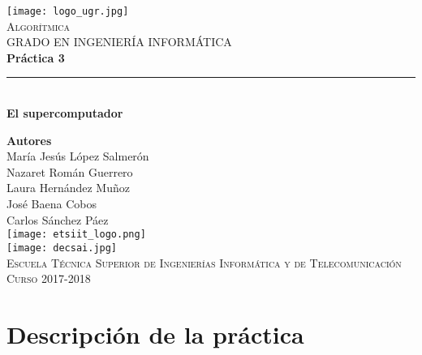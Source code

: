 \documentclass[12pt,spanish]{article}
\begin{document}
\begin{titlepage}

\newlength{\centeroffset}
\setlength{\centeroffset}{-0.5\oddsidemargin}
\addtolength{\centeroffset}{0.5\evensidemargin}
\thispagestyle{empty}

\noindent\hspace*{\centeroffset}
\begin{minipage}{\textwidth}

\centering
\texttt{[image: logo\_ugr.jpg]}\\[1.4cm]

\textsc{ \Large Algorítmica\\[0.2cm]}
\textsc{GRADO EN INGENIERÍA INFORMÁTICA}\\[1cm]

{\Huge\bfseries Práctica 3\\}
\noindent\rule[-1ex]{\textwidth}{3pt}\\[3.5ex]
{\large\bfseries El supercomputador}
\end{minipage}

\vspace{1.5cm}
\noindent\hspace*{\centeroffset}
\begin{minipage}{\textwidth}
\centering

\textbf{Autores}\\ {María Jesús López Salmerón \\ Nazaret Román Guerrero \\ Laura Hernández Muñoz \\ José Baena Cobos  \\ Carlos Sánchez Páez}\\[2.5ex]
\texttt{[image: etsiit\_logo.png]}\\[0.1cm]
\vspace{1.5cm}
\texttt{[image: decsai.jpg]}\\[0.1cm]
\vspace{1cm}
\textsc{Escuela Técnica Superior de Ingenierías Informática y de Telecomunicación}\\
\vspace{1cm}
\textsc{Curso 2017-2018}
\end{minipage}
\end{titlepage}
\tableofcontents
\thispagestyle{empty}
\listoffigures
\newpage
\setcounter{page}{1}
\section{Descripción de la práctica}
\end{document}
